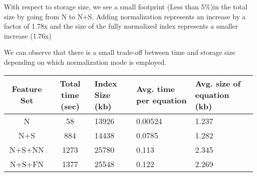 With respect to storage size, we see a small footprint (Less than 5\%)in the total size by going from N to N+S. Adding normalization represents an increase by a factor of 1.78x and the size of the fully normalized index represents a smaller increase (1.76x)

We can observe that there is a small trade-off between time and storage size depending on which normalization mode is employed.

\begin{tabular}{|c|c|p{2cm}|p{2cm}|p{2cm}|}
\hline 
Feature Set & Total time (sec) & Index Size (kb) & Avg. time per equation & Avg. size of equation (kb) \\ 
\hline 
N & 58 & 13926 & 0.00524 & 1.237 \\ 
\hline 
N+S & 884 & 14438 & 0.0785 & 1.282 \\ 
\hline 
N+S+NN & 1273 & 25780 & 0.113 & 2.345 \\ 
\hline 
N+S+FN & 1377 & 25548 & 0.122 & 2.269 \\ 
\hline 
\end{tabular} 

















